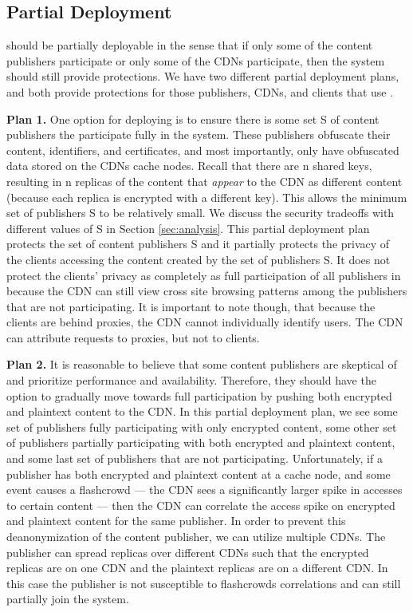 \subsection{Partial Deployment}
\label{sec:partial}
\system{} should be partially deployable in the sense that if only some of the content publishers participate or only some of the CDNs participate, then 
the system should still provide protections.  We have two different partial deployment plans, and both provide protections for those 
publishers, CDNs, and clients that use \system{}. 

{\bf Plan 1.}
One option for deploying \system{} is to ensure there is some set S of content publishers the participate fully in the 
system.  These publishers obfuscate their content, identifiers, and certificates, and most importantly, only have 
obfuscated data stored on the CDNs cache nodes.  Recall that there are n shared keys, resulting in n replicas of the 
content that {\it appear} to the CDN as different content (because each replica is encrypted with a different key).  This 
allows the minimum set of publishers S to be relatively small.  We discuss the security tradeoffs with different 
values of S in Section \ref{sec:analysis}.  This partial deployment plan protects the set of content publishers S and it 
partially protects the privacy of the clients accessing the content created by the set of publishers S.  It does not 
protect the clients' privacy as completely as full participation of all publishers in \system{} because the CDN can 
still view cross site browsing patterns among the publishers that are not participating. It is important to note though, that 
because the clients are behind proxies, the CDN cannot individually identify users.  The CDN can attribute requests to proxies, but 
not to clients.  

{\bf Plan 2.} 
It is reasonable to believe that some content publishers are skeptical of \system{} and prioritize performance 
and availability.  Therefore, they should have the option to gradually move towards full participation by pushing 
both encrypted and plaintext content to the CDN.  In this partial deployment plan, we see some set of publishers 
fully participating with only encrypted content, some other set of publishers partially participating with both 
encrypted and plaintext content, and some last set of publishers that are not participating.  Unfortunately, if 
a publisher has both encrypted and plaintext content at a cache node, and some event causes a flashcrowd --- 
the CDN sees a significantly larger spike in accesses to certain content --- then the CDN can correlate the access 
spike on encrypted and plaintext content for the same publisher.  In order to prevent this deanonymization of the 
content publisher, we can utilize multiple CDNs.  The publisher can spread replicas over different CDNs such that 
the encrypted replicas are on one CDN and the plaintext replicas are on a different CDN.  In this case the publisher 
is not susceptible to flashcrowds correlations and can still partially join the system.

